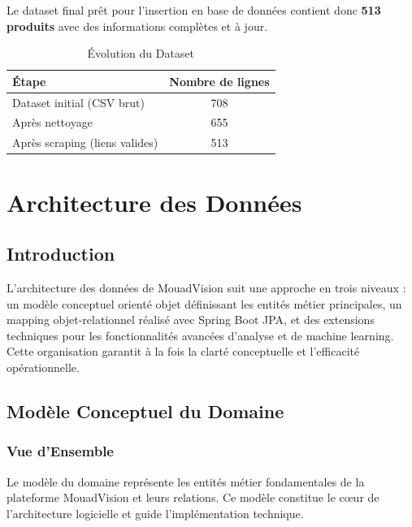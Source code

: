 \documentclass[12pt,a4paper]{report}
\begin{document}
Le dataset final prêt pour l'insertion en base de données contient donc \textbf{513 produits} avec des informations complètes et à jour.

\begin{table}[H]
    \centering
    \caption{Évolution du Dataset}
    \begin{tabular}{lc}
        \toprule
        \textbf{Étape} & \textbf{Nombre de lignes} \\
        \midrule
        Dataset initial (CSV brut) & 708 \\
        Après nettoyage & 655 \\
        Après scraping (liens valides) & 513 \\
        \bottomrule
    \end{tabular}
    \label{tab:dataset_evolution}
\end{table}

\chapter{Architecture des Données}

\section{Introduction}

L'architecture des données de MouadVision suit une approche en trois niveaux : un modèle conceptuel orienté objet définissant les entités métier principales, un mapping objet-relationnel réalisé avec Spring Boot JPA, et des extensions techniques pour les fonctionnalités avancées d'analyse et de machine learning. Cette organisation garantit à la fois la clarté conceptuelle et l'efficacité opérationnelle.

\section{Modèle Conceptuel du Domaine}

\subsection{Vue d'Ensemble}

Le modèle du domaine représente les entités métier fondamentales de la plateforme MouadVision et leurs relations. Ce modèle constitue le cœur de l'architecture logicielle et guide l'implémentation technique.
\end{document}

